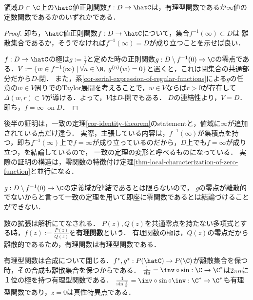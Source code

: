 \documentclass[uplatex, dvipdfmx]{jsreport}
\begin{document}
\begin{theorem}
    領域$D\subset\C$上の$\hatC$値正則関数$f:D\to\hatC$は，有理型関数であるか$\infty$値の定数関数であるかのいずれかである．
\end{theorem}
\begin{proof}
    即ち，$\hatC$値正則関数$f:D\to\hatC$について，集合$f^{-1}(\infty)\subset D$は
    離散集合であるか，そうでなければ$f^{-1}(\infty)=D$が成り立つことを示せば良い．

    $f:D\to\hatC$の極は$g:=\frac{1}{f}$と定めた時の正則関数$g:D\setminus f^{-1}(0)\to\C$の零点である．$V:=\{w\in f^{-1}(\infty)\mid\forall n\in\N,\; g^{(n)}(w)=0\}$と置くと，これは閉集合の共通部分だから$D$-閉．
    また，系\ref{cor-serial-expression-of-regular-functions}による$g$の任意の$w\in V$周りでのTaylor展開を考えることで，$w\in V$ならば$r>0$が存在して$\Delta(w,r)\subset V$が導ける．よって，$V$は$D$-開でもある．
    $D$の連結性より，$V=D$．即ち，$f=\infty\;\;\mathrm{on}\;D$．
\end{proof}
\begin{remarks}
    後半の証明は，一致の定理\ref{cor-identity-theorem}のstatementと，値域に$\infty$が追加されている点だけ違う．
    実際，主張している内容は，$f^{-1}(\infty)$が集積点を持つ，即ち$f^{-1}(\infty)$上で$f=\infty$が成り立っているのだから，$D$上でも$f=\infty$が成り立つ，を結論しているので，
    一致の定理の変形と呼べるものになっている．
    実際の証明の構造は，零関数の特徴付け定理\ref{thm-local-characterization-of-zero-function}と並行になる．

    $g:D\setminus f^{-1}(0)\to\C$の定義域が連結であるとは限らないので，
    $g$の零点が離散的でないからと言って一致の定理を用いて即座に零関数であるとは結論づけることができない．
\end{remarks}

\begin{example}
    数の拡張は解析にてなされる．
    $P(z),Q(z)$を共通零点を持たない多項式とする時，$f(z):=\frac{P(z)}{Q(z)}$を\textbf{有理関数}という．
    有理関数の極は，$Q(z)$の零点だから離散的であるため，有理関数は有理型関数である．
\end{example}

\begin{example}
    有理型関数は合成について閉じる．$f^*,g^*:P(\hatC)\to P(\C)$が離散集合を保つ時，その合成も離散集合を保つからである．
    $\frac{1}{\sin}=\inv\circ\sin:\C\to\C^*$は$2\pi n$に１位の極を持つ有理型関数である．
    $\frac{1}{\sin\frac{1}{z}}=\inv\circ\sin\circ\inv:\C^*\to\C^*$も有理型関数であり，$z=0$は真性特異点である．
\end{example}
\end{document}
